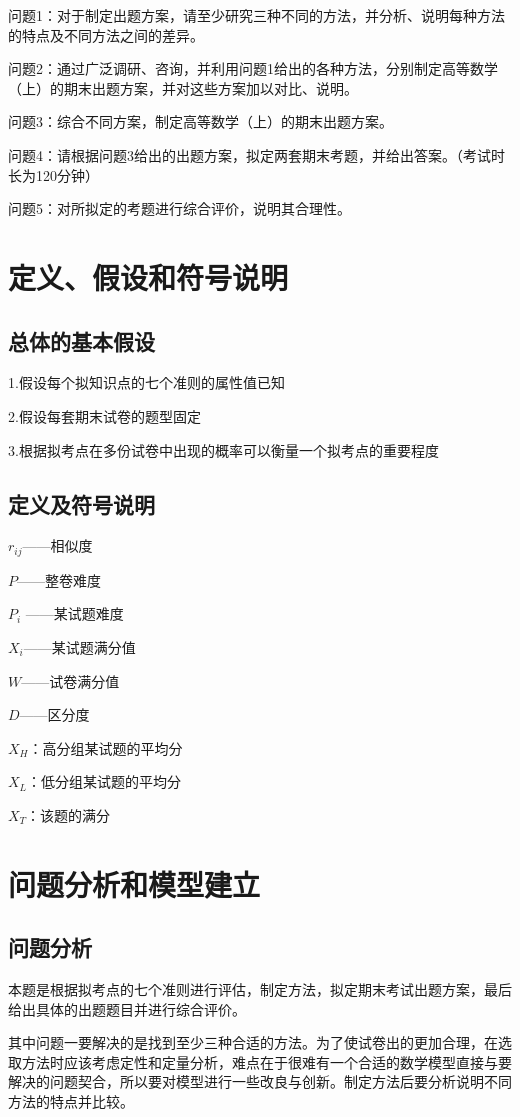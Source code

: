 \documentclass{ctexart}
\begin{document}
问题1：对于制定出题方案，请至少研究三种不同的方法，并分析、说明每种方法的特点及不同方法之间的差异。

问题2：通过广泛调研、咨询，并利用问题1给出的各种方法，分别制定高等数学（上）的期末出题方案，并对这些方案加以对比、说明。

问题3：综合不同方案，制定高等数学（上）的期末出题方案。

问题4：请根据问题3给出的出题方案，拟定两套期末考题，并给出答案。（考试时长为120分钟）

问题5：对所拟定的考题进行综合评价，说明其合理性。

\section{定义、假设和符号说明}
\subsection{总体的基本假设}

1.假设每个拟知识点的七个准则的属性值已知

2.假设每套期末试卷的题型固定

3.根据拟考点在多份试卷中出现的概率可以衡量一个拟考点的重要程度
\subsection{定义及符号说明}
$r_{ij}$——相似度

$P$——整卷难度

$P_{i}$ ——某试题难度

$X_{i}$——某试题满分值

$W$——试卷满分值

$D$——区分度

$X_{H}$：高分组某试题的平均分

$X_{L}$：低分组某试题的平均分

$X_{T}$：该题的满分


\section{问题分析和模型建立}
\subsection{问题分析}
本题是根据拟考点的七个准则进行评估，制定方法，拟定期末考试出题方案，最后给出具体的出题题目并进行综合评价。

其中问题一要解决的是找到至少三种合适的方法。为了使试卷出的更加合理，在选取方法时应该考虑定性和定量分析，难点在于很难有一个合适的数学模型直接与要解决的问题契合，所以要对模型进行一些改良与创新。制定方法后要分析说明不同方法的特点并比较。
\end{document}
